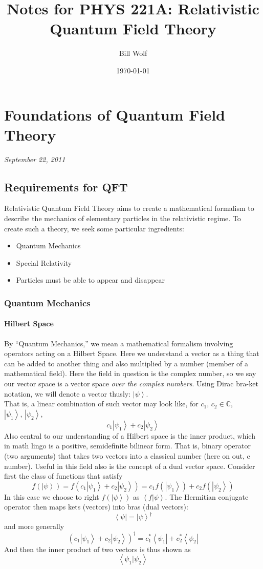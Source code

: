 \documentclass[10pt]{article}
\title{Notes for PHYS 221A: Relativistic Quantum Field Theory}
\author{Bill Wolf}
\date{\today}
\newcommand{\n}{\noindent}
\newcommand{\ket}[1]{\left|#1\right>}
\newcommand{\bra}[1]{\left<#1\right|}
\newcommand{\ip}[2]{\left<#1|#2\right>}
\begin{document}
\vfill\maketitle\vfill \newpage

\tableofcontents \newpage


\section{Foundations of Quantum Field Theory}
	\emph{September 22, 2011}
	\subsection{Requirements for QFT}
	Relativistic Quantum Field Theory aims to create a mathematical formalism to describe the mechanics of elementary particles in the relativistic regime. To create such a theory, we seek some particular ingredients:
	\begin{itemize}
		\item Quantum Mechanics
		\item Special Relativity
		\item Particles must be able to appear and disappear
	\end{itemize}
	\subsubsection{Quantum Mechanics}
	\paragraph{Hilbert Space} By ``Quantum Mechanics,'' we mean a mathematical formalism involving operators acting on a Hilbert Space. Here we understand a vector as a thing that can be added to another thing and also multiplied by a number (member of a mathematical field). Here the field in question is the complex number, so we say our vector space is a vector space \emph{over the complex numbers}. Using Dirac bra-ket notation, we will denote a vector thusly: $\ket{\psi}$.\\
	
	\n That is, a linear combination of such vector may look like, for $c_1,\,c_2\in\mathbb{C}$, $\ket{\psi_1},\,\ket{\psi_2}$,
	$$c_1\ket{\psi_1}+c_2\ket{\psi_2}$$
	Also central to our understanding of a Hilbert space is the inner product, which in math lingo is a positive, semidefinite bilinear form. That is, binary operator (two arguments) that takes two vectors into a classical number (here on out, c number). Useful in this field also is the concept of a dual vector space. Consider first the class of functions that satisfy
	$$f\left(\ket{\psi}\right) = f\left(c_1\ket{\psi_1}+c_2\ket{\psi_2}\right) = c_1 f\left(\ket{\psi_1}\right)+c_2 f\left(\ket{\psi_2}\right)$$ 
	In this case we choose to right $f(\ket{\psi})$ as $\ip{f}{\psi}$. The Hermitian conjugate operator then maps kets (vectors) into bras (dual vectors):
	$$\bra{\psi} = \ket{\psi}^\dag$$
	and more generally
	$$\left(c_1\ket{\psi_1}+c_2\ket{\psi_2}\right)^\dag = c_1^*\bra{\psi_1}+c_2^*\bra{\psi_2}$$
	And then the inner product of two vectors is thus shown as
	$$\ip{\psi_1}{\psi_2}$$
\end{document}
